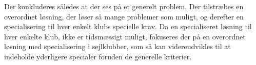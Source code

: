 Der konkluderes således at der ses på et generelt problem. Der tilstræbes en overordnet løsning, der løser så mange problemer som muligt, og derefter en specialisering til hver enkelt klubs specielle krav. Da en specialiseret løsning til hver enkelte klub, ikke er tidsmæssigt muligt, fokuseres der på en overordnet løsning med specialisering i sejlklubber, som så kan videreudvikles til at indeholde yderligere specialer foruden de generelle kriterier.

